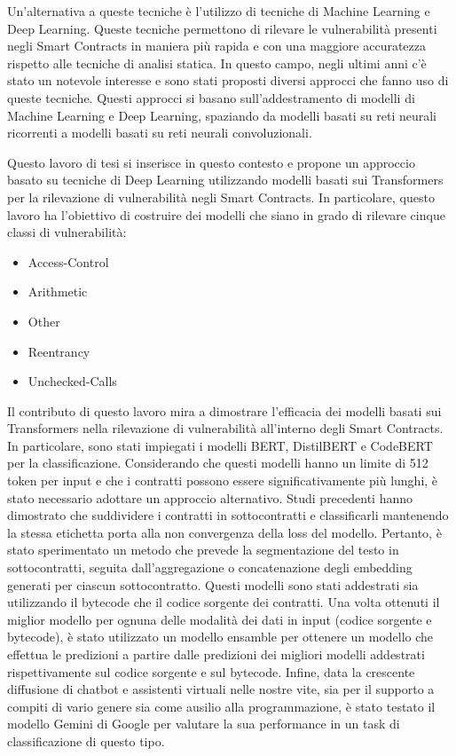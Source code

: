 \documentclass[../../Thesis.tex]{subfiles}
\begin{document}
Un'alternativa a queste tecniche \`e l'utilizzo di tecniche di Machine Learning e Deep Learning. Queste tecniche permettono di rilevare le vulnerabilit\`a presenti negli Smart Contracts in maniera pi\`u rapida e con una maggiore accuratezza rispetto alle tecniche di analisi statica. In questo campo, negli ultimi anni c'\`e stato un notevole interesse e sono stati proposti diversi approcci che fanno uso di queste tecniche. Questi approcci si basano sull'addestramento di modelli di Machine Learning e Deep Learning, spaziando da modelli basati su reti neurali ricorrenti a modelli basati su reti neurali convoluzionali. 

Questo lavoro di tesi si inserisce in questo contesto e propone un approccio basato su tecniche di Deep Learning utilizzando modelli basati sui Transformers per la rilevazione di vulnerabilit\`a negli Smart Contracts. In particolare, questo lavoro ha l'obiettivo di costruire dei modelli che siano in grado di rilevare cinque classi di vulnerabilit\`a:
\begin{itemize}
    \item Access-Control
    \item Arithmetic
    \item Other
    \item Reentrancy
    \item Unchecked-Calls
\end{itemize}

 
Il contributo di questo lavoro mira a dimostrare l'efficacia dei modelli basati sui Transformers nella rilevazione di vulnerabilit\`a all'interno degli Smart Contracts. In particolare, sono stati impiegati i modelli BERT, DistilBERT e CodeBERT per la classificazione. Considerando che questi modelli hanno un limite di 512 token per input e che i contratti possono essere significativamente pi\`u lunghi, \`e stato necessario adottare un approccio alternativo. Studi precedenti hanno dimostrato che suddividere i contratti in sottocontratti e classificarli mantenendo la stessa etichetta porta alla non convergenza della loss del modello. Pertanto, \`e stato sperimentato un metodo che prevede la segmentazione del testo in sottocontratti, seguita dall'aggregazione o concatenazione degli embedding generati per ciascun sottocontratto. Questi modelli sono stati addestrati sia utilizzando il bytecode che il codice sorgente dei contratti. 
Una volta ottenuti il miglior modello per ognuna delle modalit\`a dei dati in input (codice sorgente e bytecode), \`e stato utilizzato un modello ensamble per ottenere un modello che effettua le predizioni a partire dalle predizioni dei migliori modelli addestrati rispettivamente sul codice sorgente e sul bytecode. 
Infine, data la crescente diffusione di chatbot e assistenti virtuali nelle nostre vite, sia per il supporto a compiti di vario genere sia come ausilio alla programmazione, \`e stato testato il modello Gemini di Google per valutare la sua performance in un task di classificazione di questo tipo. 
\end{document}
